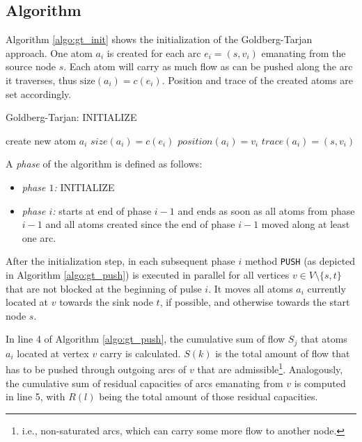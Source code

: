 \documentclass[a4paper,10pt, twocolumn]{article}
\begin{document}
\subsection{Algorithm}
\label{sec:gt_algo}
Algorithm \ref{algo:gt_init} shows the initialization of the Goldberg-Tarjan approach. One atom $a_i$ is created for each arc $e_i=(s, v_i)$ emanating from the source node $s$. Each atom will carry as much flow as can be pushed along the arc  it traverses, thus $\mathrm{size}(a_i) = c(e_i)$. Position and trace of the created atoms are set accordingly.

\begin{algorithm}
\caption{Goldberg-Tarjan: INITIALIZE}
\label{algo:gt_init}
\begin{algorithmic}[1]
		\State create new atom $a_i$
		\State $size(a_i) = c(e_i)$
		\State $position(a_i) = v_i$
		\State $trace(a_i) = (s,v_i)$		
	\EndFor
	\EndFunction
\end{algorithmic}
\end{algorithm}

A \emph{phase} of the algorithm is defined as follows:
\begin{itemize}
	\item \textit{phase $1$:} INITIALIZE
	\item \textit{phase $i$:} starts at end of phase $i-1$ and ends as soon as all atoms from phase $i-1$ and all atoms created since the end of phase $i-1$ moved along at least one arc.
\end{itemize}		

After the initialization step, in each subsequent phase $i$ method \lstinline|PUSH| (as depicted in Algorithm \ref{algo:gt_push}) is executed in parallel for all vertices $v \in V \setminus \{s,t\}$ that are not blocked at the beginning of pulse $i$. It moves all atoms $a_i$ currently located at $v$ towards the sink node $t$, if possible, and otherwise towards the start node $s$.

In line 4 of Algorithm \ref{algo:gt_push}, the cumulative sum of flow $S_j$ that atoms $a_i$ located at vertex $v$ carry is calculated. $S(k)$ is the total amount of flow that has to be pushed through outgoing arcs of $v$ that are admissible\footnote{i.e., non-saturated arcs, which can carry some more flow to another node.}. Analogously, the cumulative sum of residual capacities of arcs emanating from $v$ is computed in line 5, with $R(l)$ being the total amount of those residual capacities.
\end{document}
